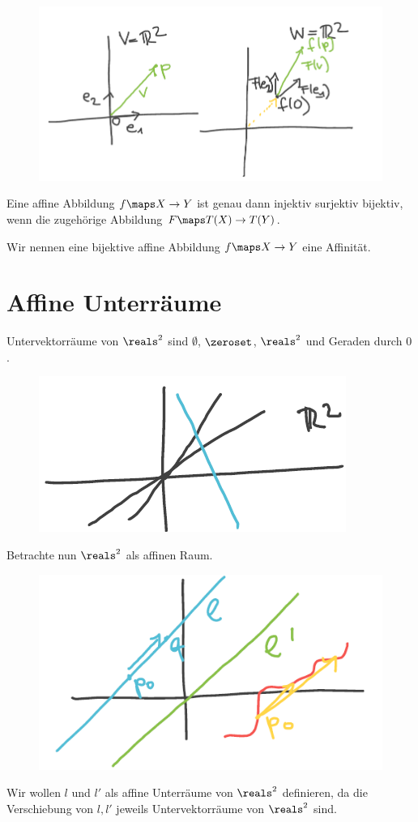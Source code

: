 \begin{figure}[H]
    \centering
    \includegraphics[width=0.7\linewidth]{figures/affine_abbildungen_vektorraeume}
    \label{fig:affine_abbildungen_vektorraeume}
\end{figure}
\begin{bemuebung*}
    Eine affine Abbildung \( f\maps X \to Y \) ist genau dann injektiv \bzw surjektiv \bzw bijektiv, wenn die zugehörige Abbildung \( F\maps T(X)\to T(Y) \).
\end{bemuebung*}
\begin{definition*}
    Wir nennen eine bijektive affine Abbildung \( f\maps X \to Y \) eine Affinität.
\end{definition*}
\section*{Affine Unterräume}
\begin{beispiel*}
    Untervektorräume von \( \reals^2 \) sind \( \emptyset \), \( \zeroset \), \( \reals^2 \) und Geraden durch \( 0 \).
    \begin{figure}[H]
        \centering
        \includegraphics[width=0.4\linewidth]{figures/untervektorraeume_r2}
        \label{fig:untervektorraeume_r2}
    \end{figure}
    Betrachte nun \( \reals^2 \) als affinen Raum.
    \begin{figure}[H]
        \centering
        \includegraphics[width=0.5\linewidth]{figures/affine_unterraeume_r2}
        \label{fig:affine_unterraeume_r2}
    \end{figure}
    \begin{idee*}
        Wir wollen \( l \) und \( l' \) als affine Unterräume von \( \reals^2 \) definieren, da die Verschiebung von \( l, l' \) jeweils Untervektorräume von \( \reals^2 \) sind.
    \end{idee*}
\end{beispiel*}

